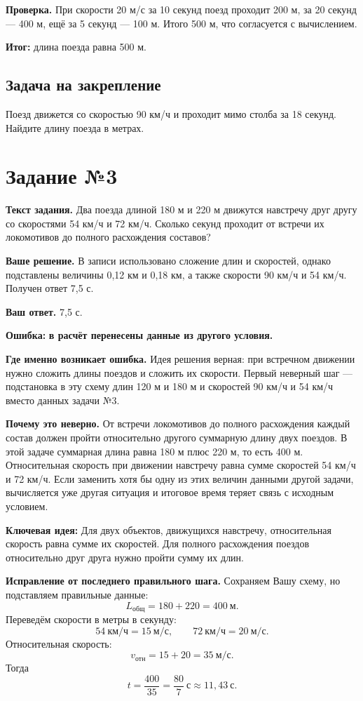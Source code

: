 \documentclass[12pt,a4paper]{article}
\newcommand{\errorlabel}[1]{\textcolor{errred}{\textbf{Ошибка:}} \textbf{#1}}
\newcommand{\keyidea}[1]{\textcolor{ideablue}{\textbf{Ключевая идея:}} #1}
\newcommand{\finalresult}[1]{\textcolor{resultteal}{\textbf{Итог:}} #1}
\begin{document}
\textbf{Проверка.} При скорости 20 м/с за 10 секунд поезд проходит 200 м, за 20 секунд --- 400 м, ещё за 5 секунд --- 100 м. Итого 500 м, что согласуется с вычислением.

\finalresult{длина поезда равна 500 м.}

\subsection*{Задача на закрепление}
Поезд движется со скоростью 90 км/ч и проходит мимо столба за 18 секунд. Найдите длину поезда в метрах.

\newpage
{}\label{task:3}
\section*{Задание №3}
\textbf{Текст задания.} Два поезда длиной 180 м и 220 м движутся навстречу друг другу со скоростями 54 км/ч и 72 км/ч. Сколько секунд проходит от встречи их локомотивов до полного расхождения составов?

\textbf{Ваше решение.} В записи использовано сложение длин и скоростей, однако подставлены величины 0,12 км и 0,18 км, а также скорости 90 км/ч и 54 км/ч. Получен ответ 7,5 с.

\textbf{Ваш ответ.} 7,5 с.

\errorlabel{в расчёт перенесены данные из другого условия.}

\textbf{Где именно возникает ошибка.} Идея решения верная: при встречном движении нужно сложить длины поездов и сложить их скорости. Первый неверный шаг --- подстановка в эту схему длин 120 м и 180 м и скоростей 90 км/ч и 54 км/ч вместо данных задачи №3.

\textbf{Почему это неверно.} От встречи локомотивов до полного расхождения каждый состав должен пройти относительно другого суммарную длину двух поездов. В этой задаче суммарная длина равна 180 м плюс 220 м, то есть 400 м. Относительная скорость при движении навстречу равна сумме скоростей 54 км/ч и 72 км/ч. Если заменить хотя бы одну из этих величин данными другой задачи, вычисляется уже другая ситуация и итоговое время теряет связь с исходным условием.

\keyidea{Для двух объектов, движущихся навстречу, относительная скорость равна сумме их скоростей. Для полного расхождения поездов относительно друг друга нужно пройти сумму их длин.}

\textbf{Исправление от последнего правильного шага.} Сохраняем Вашу схему, но подставляем правильные данные:
\[
L_{\text{общ}}=180+220=400\ \text{м}.
\]
Переведём скорости в метры в секунду:
\[
54\ \text{км/ч}=15\ \text{м/с},\qquad 72\ \text{км/ч}=20\ \text{м/с}.
\]
Относительная скорость:
\[
v_{\text{отн}}=15+20=35\ \text{м/с}.
\]
Тогда
\[
t=\frac{400}{35}=\frac{80}{7}\ \text{с}\approx 11{,}43\ \text{с}.
\]
\end{document}
